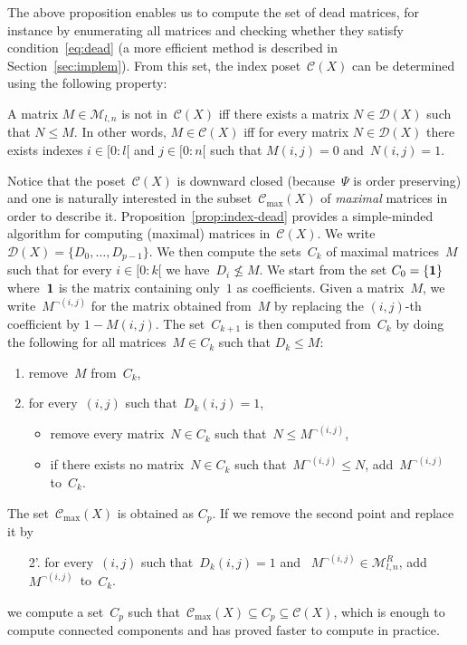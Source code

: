 \documentclass[orivec]{llncs} \usepackage[T1]{fontenc}
\newcommand\set[1]{\{#1\}}
\newcommand{\fatone}{\bf 1}
\newcommand{\Nint}[2]{[#1:#2[}
\newcommand{\C}{\mathcal{C}}
\newcommand{\nbd}{\nobreakdash-\hspace{0pt}}
\newcommand{\Mat}{\mathcal{M}}
\newcommand{\D}{\mathcal{D}}
\renewcommand{\leq}{\leqslant}
\renewcommand{\C}{\mathcal{C}}
\begin{document}
The above proposition enables us to compute the set of dead matrices, for
instance by enumerating all matrices and checking whether they satisfy
condition~\ref{eq:dead} (a more efficient method is described in
Section~\ref{sec:implem}). From this set, the index poset~$\C(X)$ can be
determined using the following property:

\begin{proposition}
  \label{prop:index-dead}
  A matrix $M\in \Mat_{l,n}$ is not in~$\C(X)$ iff there exists a matrix
  \hbox{$N\in \D(X)$} such that $N\leq M$. In other words, $M\in\C(X)$ iff for
  every matrix \hbox{$N\in \D(X)$} there exists indexes $i\in\Nint 0l$ and
  $j\in\Nint 0n$ such that $M(i,j)=0$ and~$N(i,j)=1$.
\end{proposition}

Notice that the poset~$\C(X)$ is downward closed (because~$\Psi$ is order
preserving) and one is naturally interested in the subset~$\C_{\max}(X)$ of
\emph{maximal} matrices in order to describe
it. Proposition~\ref{prop:index-dead} provides a simple-minded algorithm for
computing (maximal) matrices in~$\C(X)$. We write
$\D(X)=\set{D_0,\ldots,D_{p-1}}$. We then compute the sets~$C_k$ of maximal
matrices~$M$ such that for every $i\in\Nint 0k$ we have~$D_i\not\leq M$. We
start from the set \hbox{$C_0=\set{\fatone}$} where~$\fatone$ is the matrix
containing only~$1$ as coefficients. Given a matrix~$M$, we
write~$M^{\lnot(i,j)}$ for the matrix obtained from~$M$ by replacing the
$(i,j)$\nbd{}th coefficient by $1-M(i,j)$. The set~$C_{k+1}$ is then computed
from~$C_k$ by doing the following for all matrices~$M\in C_k$ such that
\hbox{$D_k\leq M$}:
\begin{enumerate}
\item remove~$M$ from~$C_k$,
\item for every~$(i,j)$ such that~$D_k(i,j)=1$,
  \begin{itemize}
  \item remove every matrix~$N\in C_k$ such that~$N\leq
    M^{\lnot(i,j)}$,\item if there exists no matrix~$N\in C_k$ such that~$M^{\lnot(i,j)}\leq N$,
    add~$M^{\lnot(i,j)}$ to~$C_k$.
  \end{itemize}
\end{enumerate}
The set~$\C_{\max}(X)$ is obtained as $C_p$. If we remove the second point and
replace it by
\begin{enumerate}
\item[2'.] for every~$(i,j)$ such that~$D_k(i,j)=1$ and
  ~$M^{\lnot(i,j)}\in\Mat^R_{l,n}$, \hbox{add~$M^{\lnot(i,j)}$ to~$C_k$.}
\end{enumerate}
we compute a set~$C_p$ such that~$\C_{\max}(X)\subseteq C_p\subseteq\C(X)$,
which is enough to compute connected components and has proved faster to compute
in practice.
\end{document}
